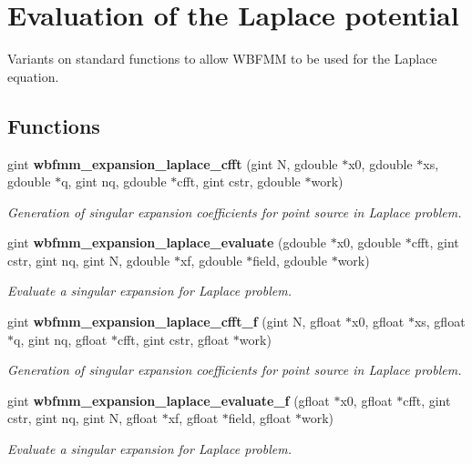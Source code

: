 \section{Evaluation of the Laplace potential}
\label{group__laplace}


Variants on standard functions to allow W\+B\+F\+M\+M to be used for the Laplace equation.  


\subsection*{Functions}
\begin{DoxyCompactItemize}
\item 
gint {\bf wbfmm\+\_\+expansion\+\_\+laplace\+\_\+cfft} (gint N, gdouble $\ast$x0, gdouble $\ast$xs, gdouble $\ast$q, gint nq, gdouble $\ast$cfft, gint cstr, gdouble $\ast$work)
\begin{DoxyCompactList}\small\item\em Generation of singular expansion coefficients for point source in Laplace problem. \end{DoxyCompactList}\item 
gint {\bf wbfmm\+\_\+expansion\+\_\+laplace\+\_\+evaluate} (gdouble $\ast$x0, gdouble $\ast$cfft, gint cstr, gint nq, gint N, gdouble $\ast$xf, gdouble $\ast$field, gdouble $\ast$work)
\begin{DoxyCompactList}\small\item\em Evaluate a singular expansion for Laplace problem. \end{DoxyCompactList}\item 
gint {\bf wbfmm\+\_\+expansion\+\_\+laplace\+\_\+cfft\+\_\+f} (gint N, gfloat $\ast$x0, gfloat $\ast$xs, gfloat $\ast$q, gint nq, gfloat $\ast$cfft, gint cstr, gfloat $\ast$work)
\begin{DoxyCompactList}\small\item\em Generation of singular expansion coefficients for point source in Laplace problem. \end{DoxyCompactList}\item 
gint {\bf wbfmm\+\_\+expansion\+\_\+laplace\+\_\+evaluate\+\_\+f} (gfloat $\ast$x0, gfloat $\ast$cfft, gint cstr, gint nq, gint N, gfloat $\ast$xf, gfloat $\ast$field, gfloat $\ast$work)
\begin{DoxyCompactList}\small\item\em Evaluate a singular expansion for Laplace problem. \end{DoxyCompactList}\end{DoxyCompactItemize}


